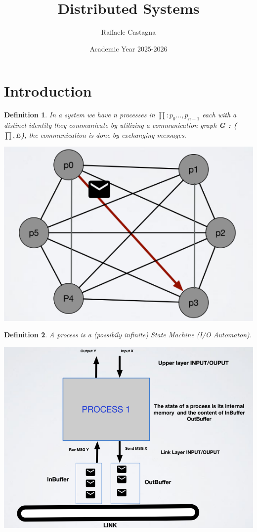 \documentclass[11pt, a4paper]{article}
\title{Distributed Systems}
\author{Raffaele Castagna}
\date{Academic Year 2025-2026}
\newtheorem{defn}{Definition}
\begin{document}
\maketitle

\tableofcontents
\newpage

\section{Introduction}
\begin{defn}
    In a system we have \textit{n} processes in $\prod:{p_{0}\dots,p_{n-1}}$ each with a distinct identity
    they communicate by utilizing a communication graph \textbf{G : ($\prod,E$)}, the communication is done by exchanging messages.

\end{defn}
\begin{center}
    \includegraphics[scale=0.6]{img/comm graph}
\end{center}
\begin{defn}
A process is a (possibily infinite) State Machine (I/O Automaton).
\end{defn}
\begin{center}
    \includegraphics[scale=0.55]{img/process.png}
\end{center}
\end{document}
